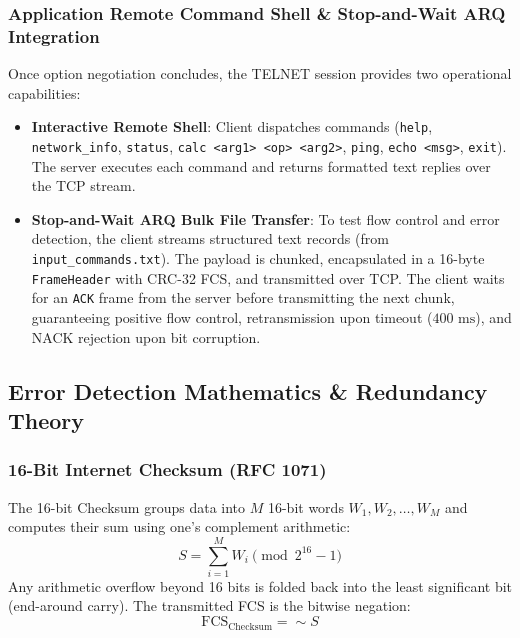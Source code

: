 \documentclass[12pt, a4paper]{article}
\begin{document}
\subsubsection{Application Remote Command Shell \& Stop-and-Wait ARQ Integration}
Once option negotiation concludes, the TELNET session provides two operational capabilities:
\begin{itemize}
    \item \textbf{Interactive Remote Shell}: Client dispatches commands (\texttt{help}, \texttt{network\_info}, \texttt{status}, \texttt{calc <arg1> <op> <arg2>}, \texttt{ping}, \texttt{echo <msg>}, \texttt{exit}). The server executes each command and returns formatted text replies over the TCP stream.
    \item \textbf{Stop-and-Wait ARQ Bulk File Transfer}: To test flow control and error detection, the client streams structured text records (from \texttt{input\_commands.txt}). The payload is chunked, encapsulated in a 16-byte \texttt{FrameHeader} with CRC-32 FCS, and transmitted over TCP. The client waits for an \texttt{ACK} frame from the server before transmitting the next chunk, guaranteeing positive flow control, retransmission upon timeout ($400\text{ ms}$), and NACK rejection upon bit corruption.
\end{itemize}

\subsection{Error Detection Mathematics \& Redundancy Theory}

\subsubsection{16-Bit Internet Checksum (RFC 1071)}
The 16-bit Checksum groups data into $M$ 16-bit words $W_1, W_2, \dots, W_M$ and computes their sum using one's complement arithmetic:
\begin{equation}
    S = \sum_{i=1}^{M} W_i \pmod{2^{16} - 1}
\end{equation}
Any arithmetic overflow beyond 16 bits is folded back into the least significant bit (end-around carry). The transmitted FCS is the bitwise negation:
\begin{equation}
    \text{FCS}_{\text{Checksum}} = \sim S
\end{equation}
\end{document}
